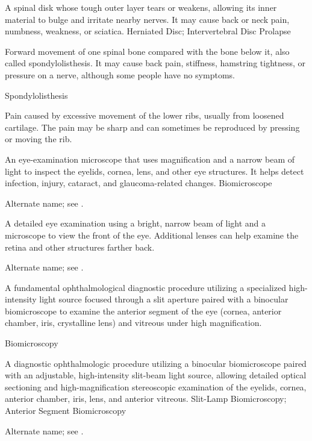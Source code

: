  A spinal disk whose tough outer layer tears or weakens, allowing its inner material to bulge and irritate nearby nerves. It may cause back or neck pain, numbness, weakness, or sciatica.
\synonyms
Herniated Disc; Intervertebral Disc Prolapse

 Forward movement of one spinal bone compared with the bone below it, also called spondylolisthesis. It may cause back pain, stiffness, hamstring tightness, or pressure on a nerve, although some people have no symptoms.

\synonyms
Spondylolisthesis

 Pain caused by excessive movement of the lower ribs, usually from loosened cartilage. The pain may be sharp and can sometimes be reproduced by pressing or moving the rib.

 An eye-examination microscope that uses magnification and a narrow beam of light to inspect the eyelids, cornea, lens, and other eye structures. It helps detect infection, injury, cataract, and glaucoma-related changes.
\synonyms
Biomicroscope

 Alternate name; see .

 A detailed eye examination using a bright, narrow beam of light and a microscope to view the front of the eye. Additional lenses can help examine the retina and other structures farther back.

 Alternate name; see .

 A fundamental ophthalmological diagnostic procedure utilizing a specialized high-intensity light source focused through a slit aperture paired with a binocular biomicroscope to examine the anterior segment of the eye (cornea, anterior chamber, iris, crystalline lens) and vitreous under high magnification.

\synonyms
Biomicroscopy

 A diagnostic ophthalmologic procedure utilizing a binocular biomicroscope paired with an adjustable, high-intensity slit-beam light source, allowing detailed optical sectioning and high-magnification stereoscopic examination of the eyelids, cornea, anterior chamber, iris, lens, and anterior vitreous.
\synonyms
Slit-Lamp Biomicroscopy; Anterior Segment Biomicroscopy

 Alternate name; see .

